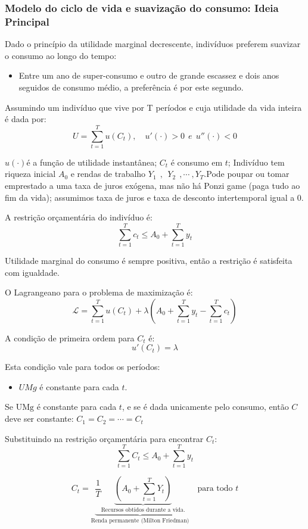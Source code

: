 \documentclass[a4paper,12pt]{article}[abntex2]
\begin{document}
\subsubsection{\textbf{Modelo do ciclo de vida e suavização do consumo: Ideia Principal}}

Dado o princípio da utilidade marginal decrescente, indivíduos preferem suavizar o consumo ao longo do tempo:\begin{itemize}
    \item Entre um ano de super-consumo e outro de grande escassez e dois anos seguidos de consumo médio, a preferência é por este segundo.
\end{itemize}

Assumindo um indivíduo que vive por T períodos e cuja utilidade da vida inteira é dada por:
\[
U=\sum_{t=1}^T u(C_t), \quad u'(\cdot)>0 \ \ e \ \ u''(\cdot)<0
\]

\(u(\cdot)\)é a função de utilidade instantânea; \(C_t\) é consumo em \(t\); Indivíduo tem riqueza inicial \(A_0\) e rendas de trabalho \(Y_1 \ \ ,\ \ Y_2 \ \ , \cdots \ ,Y_T \).Pode poupar ou tomar emprestado a uma taxa de juros exógena, mas não há Ponzi game (paga tudo ao fim da vida); assumimos taxa de juros e taxa de desconto intertemporal igual a 0.

A restrição orçamentária do indivíduo é:
\[
\sum_{t=1}^{T} c_t \leq A_0 + \sum_{t=1}^{T} y_t
\]

Utilidade marginal do consumo é sempre positiva, então a restrição é satisfeita com igualdade.

O Lagrangeano para o problema de maximização é:
\[
\mathcal{L} = \sum_{t=1}^{T} u(C_t) + \lambda \left( A_0 + \sum_{t=1}^{T} y_t - \sum_{t=1}^{T} c_t \right)
\]

A condição de primeira ordem para \( C_t \) é:
\[
u'(C_t) = \lambda
\]

Esta condição vale para todos os períodos:\begin{itemize}
    \item \(UMg\) é constante para cada \(t\).
\end{itemize}

Se \( \text{UMg} \) é constante para cada \( t \), e se é dada unicamente pelo consumo, então \( C \) deve ser constante: \(C_1 = C_2 = \cdots = C_t\)

Substituindo na restrição orçamentária para encontrar \( C_t \):
\[
\sum_{t=1}^{T} C_t \leq A_0 + \sum_{t=1}^{T} y_t
\]

\[
C_t = \underbrace{\frac{1}{T} \underbrace{\left( A_0 + \sum_{t=1}^{T} Y_t \right)}_{\text{Recursos obtidos durante a vida.}}}_\text{Renda permanente (Milton Friedman)} \quad \text{para todo } t
\]
\end{document}
